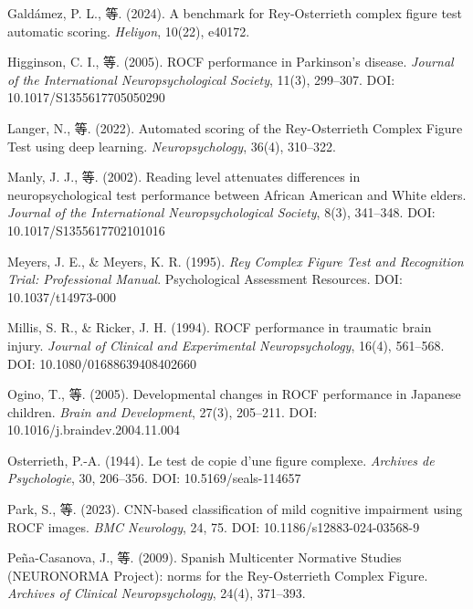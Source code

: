 \documentclass[12pt,a4paper]{ctexart}
\begin{document}
\begin{enumerate}[leftmargin=2em,label={[\arabic*]}]
\item Galdámez, P. L., 等. (2024). A benchmark for Rey-Osterrieth complex figure test automatic scoring. \textit{Heliyon}, 10(22), e40172.

\item Higginson, C. I., 等. (2005). ROCF performance in Parkinson's disease. \textit{Journal of the International Neuropsychological Society}, 11(3), 299–307. DOI: 10.1017/S1355617705050290

\item Langer, N., 等. (2022). Automated scoring of the Rey-Osterrieth Complex Figure Test using deep learning. \textit{Neuropsychology}, 36(4), 310–322.

\item Manly, J. J., 等. (2002). Reading level attenuates differences in neuropsychological test performance between African American and White elders. \textit{Journal of the International Neuropsychological Society}, 8(3), 341–348. DOI: 10.1017/S1355617702101016

\item Meyers, J. E., \& Meyers, K. R. (1995). \textit{Rey Complex Figure Test and Recognition Trial: Professional Manual}. Psychological Assessment Resources. DOI: 10.1037/t14973-000

\item Millis, S. R., \& Ricker, J. H. (1994). ROCF performance in traumatic brain injury. \textit{Journal of Clinical and Experimental Neuropsychology}, 16(4), 561–568. DOI: 10.1080/01688639408402660

\item Ogino, T., 等. (2005). Developmental changes in ROCF performance in Japanese children. \textit{Brain and Development}, 27(3), 205–211. DOI: 10.1016/j.braindev.2004.11.004

\item Osterrieth, P.-A. (1944). Le test de copie d'une figure complexe. \textit{Archives de Psychologie}, 30, 206–356. DOI: 10.5169/seals-114657

\item Park, S., 等. (2023). CNN-based classification of mild cognitive impairment using ROCF images. \textit{BMC Neurology}, 24, 75. DOI: 10.1186/s12883-024-03568-9

\item Peña-Casanova, J., 等. (2009). Spanish Multicenter Normative Studies (NEURONORMA Project): norms for the Rey-Osterrieth Complex Figure. \textit{Archives of Clinical Neuropsychology}, 24(4), 371–393.


\end{enumerate}
\end{document}
